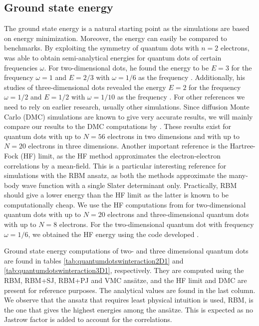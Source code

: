 \subsection{Ground state energy} \label{sec:groundstateenergy}
The ground state energy is a natural starting point as the simulations are based on energy minimization. Moreover, the energy can easily be compared to benchmarks. By exploiting the symmetry of quantum dots with $n=2$ electrons, \citeauthor{taut_two_1993} was able to obtain semi-analytical energies for quantum dots of certain frequencies $\omega$. For two-dimensional dots, he found the energy to be $E=3$ for the frequency $\omega=1$ and $E=2/3$ with $\omega=1/6$ as the frequency \supercite{taut_two_1993}. Additionally, his studies of three-dimensional dots revealed the energy $E=2$ for the frequency $\omega=1/2$ and $E=1/2$ with $\omega=1/10$ as the frequency \supercite{taut_two_1994}. For other references we need to rely on earlier research, usually other simulations. Since diffusion Monte Carlo (DMC) simulations are known to give very accurate results, we will mainly compare our results to the DMC computations by \citet{hogberget_quantum_2013}. These results exist for quantum dots with up to $N=56$ electrons in two dimensions and with up to $N=20$ electrons in three dimensions. Another important reference is the Hartree-Fock (HF) limit, as the HF method approximates the electron-electron correlations by a mean-field. This is a particular interesting reference for simulations with the RBM ansatz, as both the methods approximate the many-body wave function with a single Slater determinant only. Practically, RBM should give a lower energy than the HF limit as the latter is known to be computationally cheap. We use the HF computations from \citet{mariadason_quantum_2018} for two-dimensional quantum dots with up to $N=20$ electrons and three-dimensional quantum dots with up to $N=8$ electrons. For the two-dimensional quantum dot with frequency $\omega=1/6$, we obtained the HF energy using the code developed \citeauthor{mariadason_quantum_2018}\supercite{mariadason_hartreefock_2018}.

Ground state energy computations of two- and three dimensional quantum dots are found in tables \eqref{tab:quantumdotswinteraction2D1} and \eqref{tab:quantumdotswinteraction3D1}, respectively. They are computed using the RBM, RBM+SJ, RBM+PJ and VMC ansätze, and the HF limit and DMC are present for reference purposes. The analytical values are found in the last column. We observe that the ansatz that requires least physical intuition is used, RBM, is the one that gives the highest energies among the ansätze. This is expected as no Jastrow factor is added to account for the correlations. 

